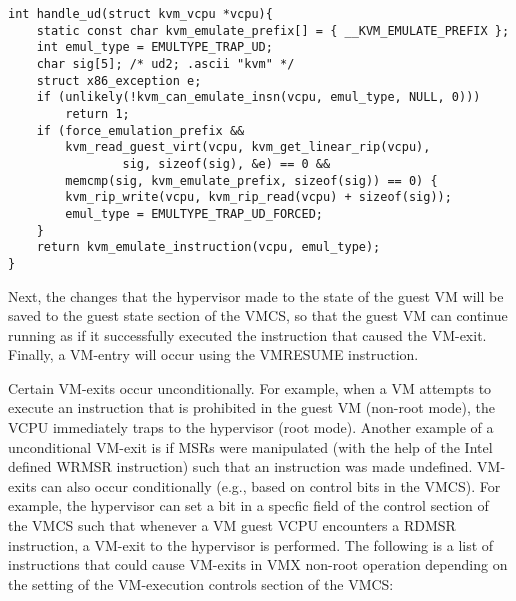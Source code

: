 \documentclass{report}
\begin{document}
\begin{spacing}{1.5}
{


\begin{lstlisting}[caption={/arch/x86/kvm/x86.c:6959 | Linux kernel V5.18.8},captionpos=b]
int handle_ud(struct kvm_vcpu *vcpu){
    static const char kvm_emulate_prefix[] = { __KVM_EMULATE_PREFIX };
    int emul_type = EMULTYPE_TRAP_UD;
    char sig[5]; /* ud2; .ascii "kvm" */
    struct x86_exception e;
    if (unlikely(!kvm_can_emulate_insn(vcpu, emul_type, NULL, 0)))
        return 1;
    if (force_emulation_prefix &&
        kvm_read_guest_virt(vcpu, kvm_get_linear_rip(vcpu),
                sig, sizeof(sig), &e) == 0 &&
        memcmp(sig, kvm_emulate_prefix, sizeof(sig)) == 0) {
        kvm_rip_write(vcpu, kvm_rip_read(vcpu) + sizeof(sig));
        emul_type = EMULTYPE_TRAP_UD_FORCED;
    }
    return kvm_emulate_instruction(vcpu, emul_type);
}
\end{lstlisting}

Next, the changes that the hypervisor made to the state of the guest VM will be saved to the guest state section of the VMCS, so that the guest VM can continue running as if it successfully executed the instruction that caused the VM-exit. Finally, a VM-entry will occur using the VMRESUME instruction.
\newline
}

{\large
Certain VM-exits occur unconditionally. For example, when a VM attempts to execute an instruction that is prohibited in the guest VM (non-root mode), the VCPU immediately traps to the hypervisor (root mode). Another example of a unconditional VM-exit is if MSRs were manipulated (with the help of the Intel defined WRMSR instruction) such that an instruction was made undefined. VM-exits can also occur conditionally (e.g., based on control bits in the VMCS). For example, the hypervisor can set a bit in a specfic field of the control section of the VMCS such that whenever a VM guest VCPU encounters a RDMSR instruction, a VM-exit to the hypervisor is performed. The following is a list of instructions that could cause VM-exits in VMX non-root operation depending on the setting of the VM-execution controls section of the VMCS: 
\leavevmode\newline


}
\end{spacing}
\end{document}
